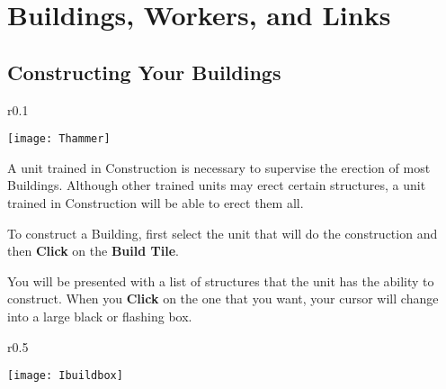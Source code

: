 
\chapter{Buildings, Workers, and Links}

\section{Constructing Your Buildings}


\begin{wrapfigure}{r}{0.1\textwidth}
	\vspace{-20pt}
	\begin{center}
		\texttt{[image: Thammer]}
	\end{center}
	\vspace{-20pt}
\end{wrapfigure}

A unit trained in Construction is necessary to supervise the erection of most Buildings. Although other trained units may erect certain structures, a unit trained in Construction will be able to erect them all.

To construct a Building, first select the unit that will do the construction and then \textbf{Click} on the \textbf{Build Tile}.

You will be presented with a list of structures that the unit has the ability to construct. When you \textbf{Click} on the one that you want, your cursor will change into a large black or flashing box.

\begin{wrapfigure}{r}{0.5\textwidth}
	\vspace{-20pt}
	\begin{center}
		\texttt{[image: Ibuildbox]}
	\end{center}
	\vspace{-20pt}
\end{wrapfigure}


